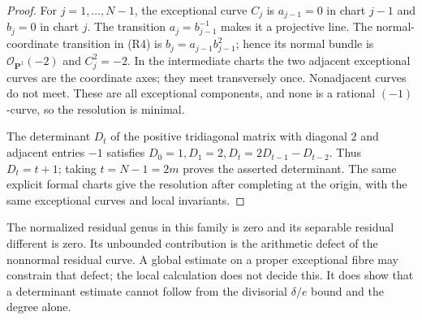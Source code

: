 \begin{proof}
For \(j=1,\ldots,N-1\), the exceptional curve \(C_j\) is
\(a_{j-1}=0\) in chart \(j-1\) and \(b_j=0\) in chart \(j\).
The transition \(a_j=b_{j-1}^{-1}\) makes it a projective line.
The normal-coordinate transition in (R4) is
\(b_j=a_{j-1}b_{j-1}^2\); hence its normal bundle is
\(\mathcal O_{\mathbf P^1}(-2)\) and \(C_j^2=-2\).
In the intermediate charts the two adjacent exceptional curves
are the coordinate axes; they meet transversely once.
Nonadjacent curves do not meet. These are all exceptional
components, and none is a rational \((-1)\)-curve, so the
resolution is minimal.

The determinant \(D_t\) of the positive tridiagonal matrix with
diagonal \(2\) and adjacent entries \(-1\) satisfies
\(D_0=1,D_1=2,D_t=2D_{t-1}-D_{t-2}\).
Thus \(D_t=t+1\); taking \(t=N-1=2m\) proves the asserted
determinant. The same explicit formal charts give the resolution
after completing at the origin, with the same exceptional
curves and local invariants.
\end{proof}

\begin{remark}
The normalized residual genus in this family is zero and its
separable residual different is zero. Its unbounded contribution
is the arithmetic defect of the nonnormal residual curve.
A global estimate on a proper exceptional fibre may constrain
that defect; the local calculation does not decide this.
It does show that a determinant estimate cannot follow from the
divisorial \(\delta/e\) bound and the degree alone.
\end{remark}

